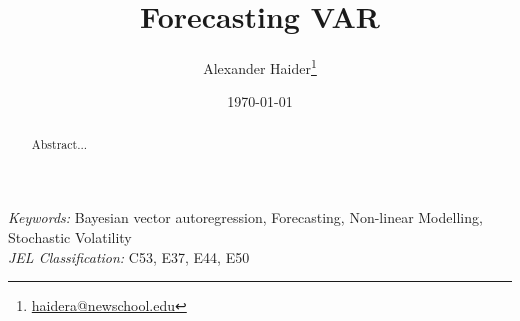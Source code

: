 \documentclass[12pt,letterpaper,fleqn]{article}           %
\begin{document}
\begin{titlepage}

\title{\textbf{Forecasting VAR}}

\renewcommand*{\Authsep}{, }
\renewcommand*{\Authand}{, }
\renewcommand*{\Authands}{, }
\renewcommand*{\Affilfont}{\small\normalfont}
\setlength{\affilsep}{2em}   %

\author[1]{Alexander Haider\thanks{\href{mailto:haidera@newschool.edu}{haidera@newschool.edu}}} %
\date{\mydate \today}
\maketitle
\thispagestyle{empty}

\vspace{-.5cm}
\begin{abstract}
\onehalfspacing

Abstract...

\end{abstract} %

\onehalfspacing \small
\noindent \textit{Keywords:} Bayesian vector autoregression, Forecasting, Non-linear Modelling, Stochastic Volatility \\  \textit{JEL Classification:} C53, E37, E44, E50 


\end{titlepage}

\clearpage
\onehalfspacing
\end{document}
